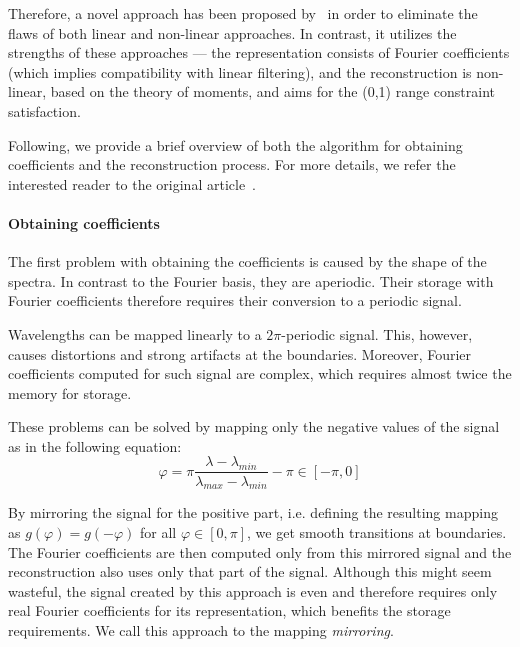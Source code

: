 Therefore, a novel approach has been proposed by~\citet{trigonometricMomentsPaper} in order to eliminate the flaws of both linear and non-linear approaches. In contrast, it utilizes the strengths of these approaches --- the representation consists of Fourier coefficients (which implies compatibility with linear filtering), and the reconstruction is non-linear, based on the theory of moments, and aims for the (0,1) range constraint satisfaction.

Following, we provide a brief overview of both the algorithm for obtaining coefficients and the reconstruction process. For more details, we refer the interested reader to the original article~\cite{trigonometricMomentsPaper}.

\paragraph{Obtaining coefficients} \label{par:spectrumToCoefficientConversion}

The first problem with obtaining the coefficients is caused by the shape of the spectra. In contrast to the Fourier basis, they are aperiodic. Their storage with Fourier coefficients therefore requires their conversion to a periodic signal.

Wavelengths can be mapped linearly to a $2\pi$-periodic signal. This, however, causes distortions and strong artifacts at the boundaries. Moreover, Fourier coefficients computed for such signal are complex, which requires almost twice the memory for storage.

These problems can be solved by mapping only the negative values of the signal as in the following equation:
\begin{equation} \label{wavelengthPhaseMapping}
\varphi =\pi \dfrac{\lambda - \lambda_{min}}{\lambda_{max} - \lambda_{min}} - \pi\in[-\pi, 0]
\end{equation}

By mirroring the signal for the positive part, i.e. defining the resulting mapping as $g(\varphi) = g(-\varphi)$ for all $\varphi\in[0,\pi]$, we get smooth transitions at boundaries. The Fourier coefficients are then computed only from this mirrored signal and the reconstruction also uses only that part of the signal. Although this might seem wasteful, the signal created by this approach is even and therefore requires only real Fourier coefficients for its representation, which benefits the storage requirements. We call this approach to the mapping \emph{mirroring}.

